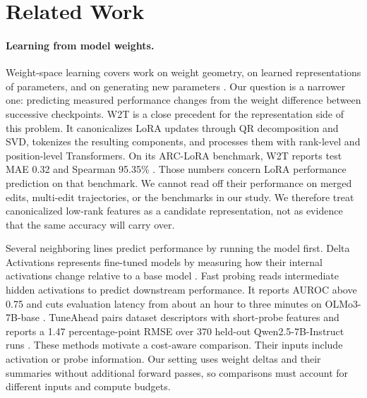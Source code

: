\section{Related Work}

\paragraph{Learning from model weights.}
Weight-space learning covers work on weight geometry, on learned representations of parameters, and on generating new parameters \citep{han2026survey}. Our question is a narrower one: predicting measured performance changes from the weight difference between successive checkpoints. W2T is a close precedent for the representation side of this problem. It canonicalizes LoRA updates through QR decomposition and SVD, tokenizes the resulting components, and processes them with rank-level and position-level Transformers. On its ARC-LoRA benchmark, W2T reports test MAE 0.32 and Spearman 95.35\% \citep{w2t2026}. Those numbers concern LoRA performance prediction on that benchmark. We cannot read off their performance on merged edits, multi-edit trajectories, or the benchmarks in our study. We therefore treat canonicalized low-rank features as a candidate representation, not as evidence that the same accuracy will carry over.

Several neighboring lines predict performance by running the model first. Delta Activations represents fine-tuned models by measuring how their internal activations change relative to a base model \citep{deltaactivations2025}. Fast probing reads intermediate hidden activations to predict downstream performance. It reports AUROC above 0.75 and cuts evaluation latency from about an hour to three minutes on OLMo3-7B-base \citep{fastprobing2026}. TuneAhead pairs dataset descriptors with short-probe features and reports a 1.47 percentage-point RMSE over 370 held-out Qwen2.5-7B-Instruct runs \citep{tuneahead2026}. These methods motivate a cost-aware comparison. Their inputs include activation or probe information. Our setting uses weight deltas and their summaries without additional forward passes, so comparisons must account for different inputs and compute budgets.

